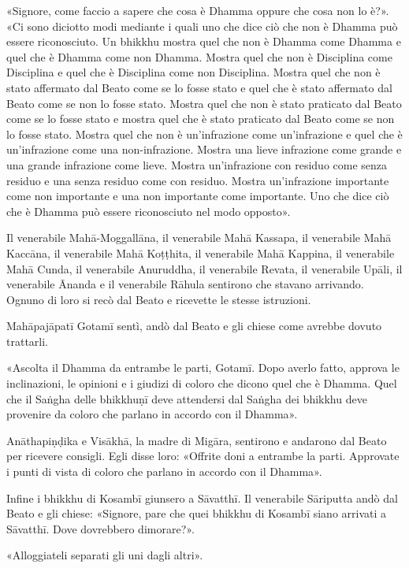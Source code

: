 «Signore, come faccio a sapere che cosa è Dhamma oppure che cosa non lo
è?». «Ci sono diciotto modi mediante i quali uno che dice ciò che non è
Dhamma può essere riconosciuto. Un bhikkhu mostra quel che non è Dhamma
come Dhamma e quel che è Dhamma come non Dhamma. Mostra quel che non è
Disciplina come Disciplina e quel che è Disciplina come non Disciplina.
Mostra quel che non è stato affermato dal Beato come se lo fosse stato e
quel che è stato affermato dal Beato come se non lo fosse stato. Mostra
quel che non è stato praticato dal Beato come se lo fosse stato e mostra
quel che è stato praticato dal Beato come se non lo fosse stato. Mostra
quel che non è un’infrazione come un’infrazione e quel che è
un’infrazione come una non-infrazione. Mostra una lieve infrazione come
grande e una grande infrazione come lieve. Mostra un’infrazione con
residuo come senza residuo e una senza residuo come con residuo. Mostra
un’infrazione importante come non importante e una non importante come
importante. Uno che dice ciò che è Dhamma può essere riconosciuto nel
modo opposto».


Il venerabile Mahā-Moggallāna, il venerabile Mahā Kassapa, il venerabile
Mahā Kaccāna, il venerabile Mahā Koṭṭhita, il venerabile Mahā Kappina,
il venerabile Mahā Cunda, il venerabile Anuruddha, il venerabile Revata,
il venerabile Upāli, il venerabile Ānanda e il venerabile Rāhula
sentirono che stavano arrivando. Ognuno di loro si recò dal Beato e
ricevette le stesse istruzioni.


Mahāpajāpatī Gotamī sentì, andò dal Beato e gli chiese come avrebbe
dovuto trattarli.


«Ascolta il Dhamma da entrambe le parti, Gotamī. Dopo averlo fatto,
approva le inclinazioni, le opinioni e i giudizi di coloro che dicono
quel che è Dhamma. Quel che il Saṅgha delle bhikkhuṇī deve attendersi
dal Saṅgha dei bhikkhu deve provenire da coloro che parlano in accordo
con il Dhamma».


Anāthapiṇḍika e Visākhā, la madre di Migāra, sentirono e andarono dal
Beato per ricevere consigli. Egli disse loro: «Offrite doni a entrambe
la parti. Approvate i punti di vista di coloro che parlano in accordo
con il Dhamma».


Infine i bhikkhu di Kosambī giunsero a Sāvatthī. Il venerabile Sāriputta
andò dal Beato e gli chiese: «Signore, pare che quei bhikkhu di Kosambī
siano arrivati a Sāvatthī. Dove dovrebbero dimorare?».


«Alloggiateli separati gli uni dagli altri».


